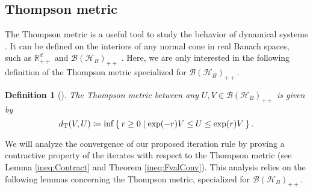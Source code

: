 \documentclass{article}
\newtheorem{definition}{Definition}[section]
\begin{document}
\subsection{Thompson metric}
The Thompson metric is a useful tool to study the behavior of dynamical systems \citep{Krause2015,Lemmens2012,Nussbaum1988,Thompson1963}. 
It 
can be defined on the interiors of any normal cone in real Banach spaces, such as $\mathbb{R}_{++}^d$ and $\mathcal{B}\left(\mathcal{H}_B\right)_{++}$ . 
Here, we are only interested in the following definition of the Thompson metric specialized for $\mathcal{B}\left(\mathcal{H}_B\right)_{++}$.
\begin{definition}[{\cite{Thompson1963}}]
    \label{eq:Thompson}
    The Thompson metric between
	any     
    $U,V\in\mathcal{B}\left(\mathcal{H}_B\right)_{++}$ %
    is given by 
    \begin{equation}
        d_{\mathrm{T}}(V,U)\coloneqq \inf %
        \Set{ r\geq0 | \exp(-r) V\leq U \leq \exp(r)V }.
    \end{equation}
\end{definition}


We
will 
analyze the convergence of our proposed iteration rule by proving a contractive property of the iterates with respect to the Thompson metric (see Lemma \ref{ineq:Contract} and Theorem \ref{ineq:FvalConv}). 
This analysis relies on the following lemmas concerning the Thompson metric, specialized for $\mathcal{B}\left(\mathcal{H}_B\right)_{++}$.
\end{document}
